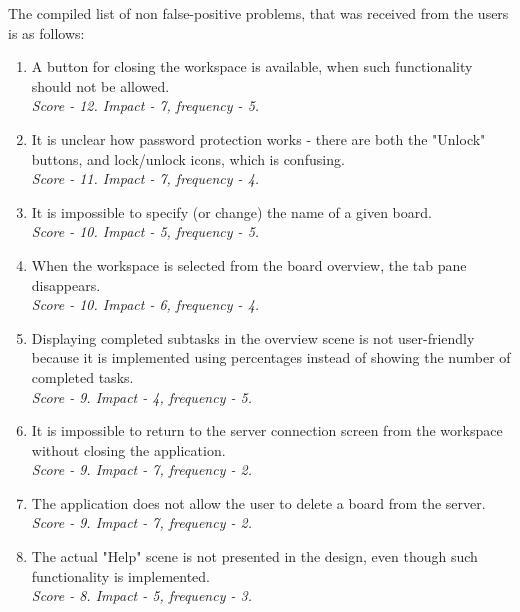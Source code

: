 The compiled list of non false-positive problems, that was received from the users is as follows:
\begin{enumerate}
  
  \item A button for closing the workspace is available, when such functionality should not be allowed.
  \\ \emph{Score - 12. Impact - 7, frequency - 5.} \\
  
  \item It is unclear how password protection works - there are both the "Unlock" buttons, and lock/unlock icons, which is confusing.
  \\ \emph{Score - 11. Impact - 7, frequency - 4.} \\

  \item It is impossible to specify (or change) the name of a given board. 
  \\ \emph{Score - 10. Impact - 5, frequency - 5.} \\

\item When the workspace is selected from the board overview, the tab pane disappears.
  \\ \emph{Score - 10. Impact - 6, frequency - 4.} \\
  
  \item Displaying completed subtasks in the overview scene is not user-friendly because it is implemented using percentages instead of showing the number of completed tasks.
  \\ \emph{Score - 9. Impact - 4, frequency - 5.} \\

  \item It is impossible to return to the server connection screen from the workspace without closing the application.
  \\ \emph{Score - 9. Impact - 7, frequency - 2.} \\
  
  \item The application does not allow the user to delete a board from the server.
  \\ \emph{Score - 9. Impact - 7, frequency - 2.} \\
  
  \item The actual "Help" scene is not presented in the design, even though such functionality is implemented.
  \\ \emph{Score - 8. Impact - 5, frequency - 3.} \\


\end{enumerate}
